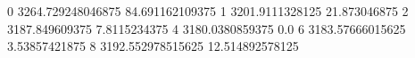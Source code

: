 0 3264.729248046875 84.691162109375
1 3201.9111328125 21.873046875
2 3187.849609375 7.8115234375
4 3180.0380859375 0.0
6 3183.57666015625 3.53857421875
8 3192.552978515625 12.514892578125
